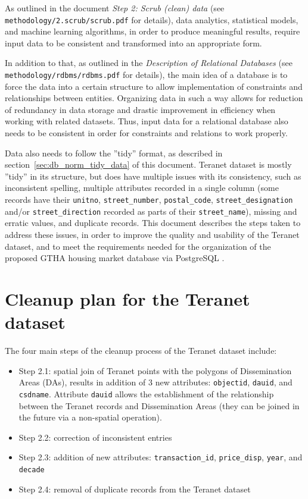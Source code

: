 \documentclass[11pt]{article}
\begin{document}
    \vspace{5mm}

    As outlined in the document \textit{Step 2: Scrub (clean) data} (see \\ \texttt{methodology/2.scrub/scrub.pdf} for details), data analytics, statistical models, and machine learning algorithms, in order to produce meaningful results, require input data to be consistent and transformed into an appropriate form.

    In addition to that, as outlined in the \textit{Description of Relational Databases} (see \texttt{methodology/rdbms/rdbms.pdf} for details), the main idea of a database is to force the data into a certain structure to allow implementation of constraints and relationships between entities.
    Organizing data in such a way allows for reduction of redundancy in data storage and drastic improvement in efficiency when working with related datasets.
    Thus, input data for a relational database also needs to be consistent in order for constraints and relations to work properly.

    Data also needs to follow the ''tidy'' format, as described in section~\ref{sec:db_norm_tidy_data} of this document.
    Teranet dataset is mostly ''tidy'' in its structure, but does have multiple issues with its consistency, such as inconsistent spelling, multiple attributes recorded in a single column (some records have their \texttt{unitno}, \texttt{street\_number}, \texttt{postal\_code}, \texttt{street\_designation} and/or \texttt{street\_direction} recorded as parts of their \texttt{street\_name}), missing and erratic values, and duplicate records.
    This document describes the steps taken to address these issues, in order to improve the quality and usability of the Teranet dataset, and to meet the requirements needed for the organization of the proposed GTHA housing market database via PostgreSQL .

    \section{Cleanup plan for the Teranet dataset} \label{sec:teranet_cleanup_plan}

    The four main steps of the cleanup process of the Teranet dataset include:
    \begin{itemize}
        \item Step 2.1: spatial join of Teranet points with the polygons of Dissemination Areas (DAs), results in addition of 3 new attributes: \texttt{objectid}, \texttt{dauid}, and \texttt{csdname}.
        Attribute \texttt{dauid} allows the establishment of the relationship between the Teranet records and Dissemination Areas (they can be joined in the future via a non-spatial operation).
        \item Step 2.2: correction of inconsistent entries
        \item Step 2.3: addition of new attributes: \texttt{transaction\_id}, \texttt{price\_disp}, \texttt{year}, and \texttt{decade}
        \item Step 2.4: removal of duplicate records from the Teranet dataset
    \end{itemize}
\end{document}
